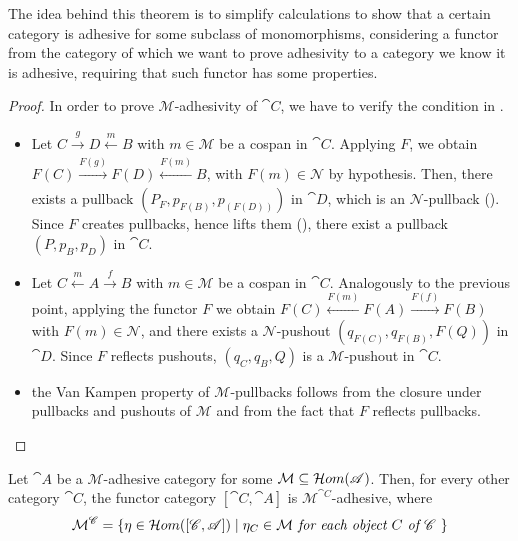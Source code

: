 The idea behind this theorem is to simplify calculations to show that a certain category is adhesive for some subclass of monomorphisms, considering a functor from the category of which we want to prove adhesivity to a category we know it is adhesive, requiring that such functor has some properties.

\begin{proof}
    In order to prove $\mathcal M$-adhesivity of $\cat C$, we have to verify the condition in .
    \begin{itemize}
        \item Let $C \xrightarrow[]{g} D \xleftarrow[]{m} B$ with $m \in \mathcal M$ be a cospan in $\cat C$. Applying $F$, we obtain $F(C) \xrightarrow[]{F(g)} F(D) \xleftarrow[]{F(m)} B$, with $F(m) \in \mathcal{N}$ by hypothesis. Then, there exists a pullback $(P_F, p_{F(B)}, p_{(F(D))})$ in $\cat D$, which is an $\mathcal N$-pullback (). Since $F$ creates pullbacks, hence lifts them (), there exist a pullback $(P, p_B, p_D)$ in $\cat C$.
        \item Let $C \xleftarrow{m} A \xrightarrow{f} B$ with $ m \in \mathcal M$ be a cospan in $\cat C$. Analogously to the previous point, applying the functor $F$ we obtain $F(C) \xleftarrow{F(m)} F(A) \xrightarrow{F(f)} F(B)$ with $ F(m) \in \mathcal N$, and there exists a $\mathcal N$-pushout $(q_{F(C)}, q_{F(B)}, F(Q))$ in $\cat D$. Since $F$ reflects pushouts, $(q_C, q_B, Q)$ is a $\mathcal{M}$-pushout in $\cat C$.
        \item the Van Kampen property of $\mathcal M$-pullbacks follows from the closure under pullbacks and pushouts of $\mathcal M$ and from the fact that $F$ reflects pullbacks.
    \end{itemize}
    
\end{proof}

\begin{cor}\label{cor:adhesivity_functor_categories}
    Let $\cat A$ be a $\mathcal M$-adhesive category for some $\mathcal M \subseteq \mathcal{H}om(\mathscr{A})$. Then, for every other category $\cat C$, the functor category $[\cat C, \cat A]$ is $\mathcal M^{\cat C}$-adhesive, where 
    \[
        \mathcal{M}^{\mathscr{C}} = \{\eta \in \mathcal{H}om([\mathscr{C}, \mathscr{A}]) \mid \eta_C \in \mathcal M \textit{ for each object $C$ of $\mathscr{C}$ }\}
    \]
\end{cor}

